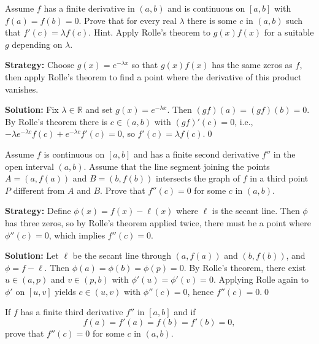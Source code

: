 \begin{problembox}
Assume \( f \) has a finite derivative in \( (a, b) \) and is continuous on \( [a, b] \) with \( f(a) = f(b) = 0 \). Prove that for every real \( \lambda \) there is some \( c \) in \( (a, b) \) such that \( f'(c) = \lambda f(c) \). Hint. Apply Rolle's theorem to \( g(x)f(x) \) for a suitable \( g \) depending on \( \lambda \).
\end{problembox}

\noindent\textbf{Strategy:} Choose \( g(x) = e^{-\lambda x} \) so that \( g(x)f(x) \) has the same zeros as \( f \), then apply Rolle's theorem to find a point where the derivative of this product vanishes.

\bigskip\noindent\textbf{Solution:}
Fix $\lambda\in\mathbb{R}$ and set $g(x)=e^{-\lambda x}$. Then $(gf)(a)=(gf)(b)=0$. By Rolle's theorem there is $c\in(a,b)$ with $(gf)'(c)=0$, i.e., $-\lambda e^{-\lambda c}f(c)+e^{-\lambda c}f'(c)=0$, so $f'(c)=\lambda f(c)$.\qed


\begin{problembox}
Assume \( f \) is continuous on \( [a, b] \) and has a finite second derivative \( f'' \) in the open interval \( (a, b) \). Assume that the line segment joining the points \( A = (a, f(a)) \) and \( B = (b, f(b)) \) intersects the graph of \( f \) in a third point \( P \) different from \( A \) and \( B \). Prove that \( f''(c) = 0 \) for some \( c \) in \( (a, b) \).
\end{problembox}

\noindent\textbf{Strategy:} Define \( \phi(x) = f(x) - \ell(x) \) where \( \ell \) is the secant line. Then \( \phi \) has three zeros, so by Rolle's theorem applied twice, there must be a point where \( \phi''(c) = 0 \), which implies \( f''(c) = 0 \).

\bigskip\noindent\textbf{Solution:}
Let $\ell$ be the secant line through $(a,f(a))$ and $(b,f(b))$, and $\phi=f-\ell$. Then $\phi(a)=\phi(b)=\phi(p)=0$. By Rolle's theorem, there exist $u\in(a,p)$ and $v\in(p,b)$ with $\phi'(u)=\phi'(v)=0$. Applying Rolle again to $\phi'$ on $[u,v]$ yields $c\in(u,v)$ with $\phi''(c)=0$, hence $f''(c)=0$.\qed


\begin{problembox}
If \( f \) has a finite third derivative \( f'' \) in \( [a, b] \) and if
\[ f(a) = f'(a) = f(b) = f'(b) = 0, \]
prove that \( f''(c) = 0 \) for some \( c \) in \( (a, b) \).
\end{problembox}

